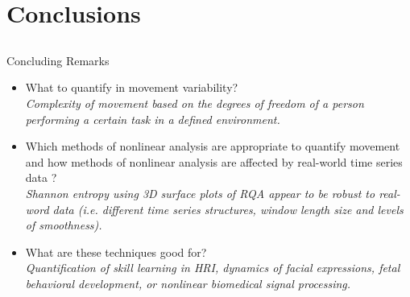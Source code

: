 \section{Conclusions}

\subsection{}
{
\begin{frame}{Concluding Remarks}

\begin{itemize}
	\item What to quantify in movement variability? \\
	\textit{Complexity of movement based on the degrees of freedom of a person
	performing a certain task in a defined environment.}

	\item Which methods of nonlinear analysis are appropriate to quantify movement and
	how methods of nonlinear analysis are affected by real-world time series data ?\\
	\textit{Shannon entropy using 3D surface plots of RQA 
	appear to be robust to real-word data (i.e. different time series
	structures, window length size and levels of smoothness).}

	\item What are these techniques good for?\\
	\textit{Quantification of skill learning in HRI, 
	dynamics of facial expressions, 
	fetal behavioral development, or
	nonlinear biomedical signal processing.}
\end{itemize}

\end{frame}
}

